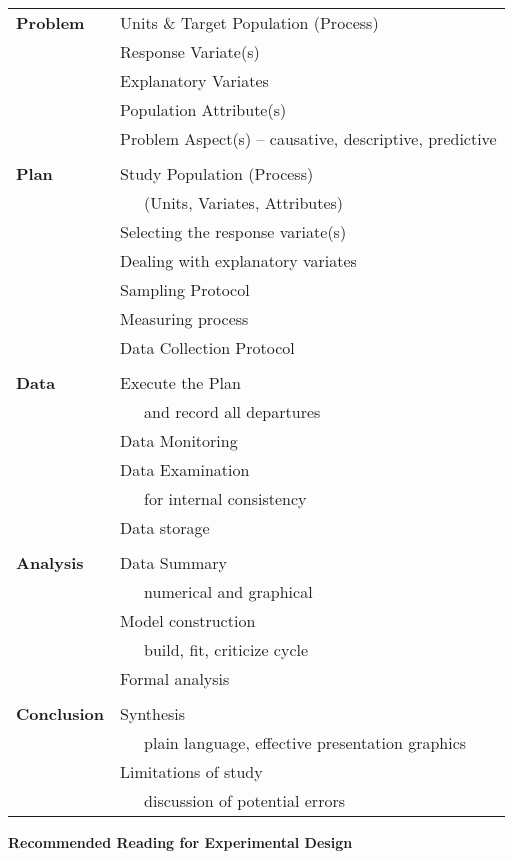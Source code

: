 {\tszs
  \begin{center}
    \begin{tabular}{ll} \hline
    \textbf{Problem} & Units \& Target Population (Process)\\
    & Response Variate(s)\\
    & Explanatory Variates\\
    & Population Attribute(s)\\
    & Problem Aspect(s) – causative, descriptive, predictive\\
    & \\
    \textbf{Plan} & Study Population (Process)\\
    & ~~~(Units, Variates, Attributes)\\
    & Selecting the response variate(s)\\
    & Dealing with explanatory variates\\
    & Sampling Protocol\\
    & Measuring process\\
    & Data Collection Protocol\\
    & \\
\textbf{Data} & Execute the Plan\\
    & ~~~and record all departures\\
    & Data Monitoring\\
    & Data Examination\\
    & ~~~for internal consistency\\
    & Data storage\\
    & \\
\textbf{Analysis} & Data Summary\\
    & ~~~numerical and graphical\\
    & Model construction\\
    & ~~~build, fit, criticize cycle\\
    & Formal analysis\\
    & \\
\textbf{Conclusion} & Synthesis\\
    & ~~~plain language, effective presentation graphics\\
    & Limitations of study\\
    & ~~~discussion of potential errors\\ \hline
\end{tabular}
\end{center}
}

\textbf{Recommended Reading for Experimental Design}

